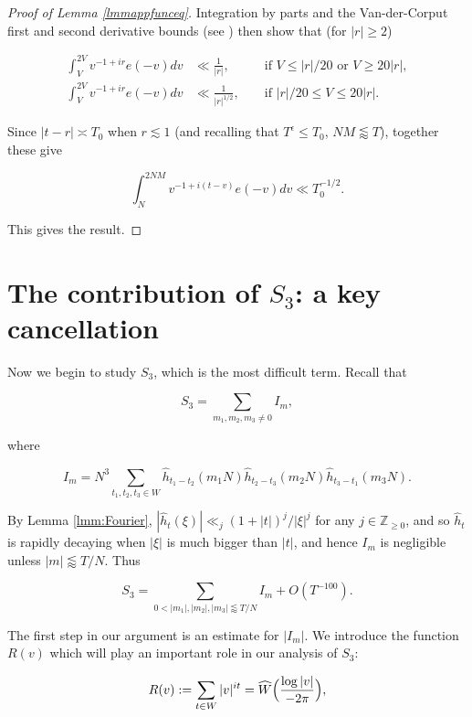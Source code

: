 \documentclass{amsart}
\theoremstyle{plain}
\numberwithin{equation}{section}
\begin{document}
\begin{proof}[Proof of Lemma \ref{lmmappfunceq}]
Integration by parts and the Van-der-Corput first and second derivative bounds (see \cite[Chapter 3, Lemmas 1 and 2]{M2}) then show that (for $|r|\ge 2$)

\begin{align*}
\int_V^{2V} v^{-1+ir}e(-v)dv&\ll \frac{1}{|r|}, &&\text{ if }V\le |r|/20 \text{ or }V\ge 20|r|,\\
\int_V^{2V} v^{-1+ir}e(-v)dv&\ll \frac{1}{|r|^{1/2}}, &&\text{ if }|r|/20\le V\le 20|r|.
\end{align*}

Since $|t-r|\asymp T_0$ when $r\lesssim 1$ (and recalling that $T^\epsilon\le T_0$, $NM\lessapprox T$), together these give

\[
\int_{N}^{2NM}v^{-1+i(t-v)}e(- v) dv\ll T_0^{-1/2}.
\]

This gives the result.
\end{proof}

%
%
%
%



\section{The contribution of \texorpdfstring{$S_3$}{S3}: a key cancellation}

Now we begin to study $S_3$, which is the most difficult term.  Recall that 

\[
S_3=\sum_{m_1,m_2,m_3 \not= 0} I_m, 
\]

where

\[
 I_m = N^3 \sum_{t_1,t_2,t_3\in W}\widehat{h}_{t_1-t_2}(m_1N)\widehat{h}_{t_2-t_3}(m_2N)\widehat{h}_{t_3-t_1}(m_3N). 
 \]
 
 By Lemma \ref{lmm:Fourier}, $|\widehat{h}_t(\xi)|\ll_j (1+|t|)^j/|\xi|^j$  for any $j\in\mathbb{Z}_{\ge 0}$,  and so $\widehat{h}_t$ is rapidly decaying when $|\xi|$ is much bigger than $|t|$, and hence $I_m$ is negligible unless $|m| \lessapprox T/N$.  Thus 

\begin{equation}
S_3= \sum_{0<|m_1|,|m_2|,|m_3| \lessapprox T/N} I_m+O(T^{-100}).
\label{eq:S3Inter}
\end{equation}

The first step in our argument is an estimate for $|I_m|$.   We introduce the function $R(v)$ which will play an important role in our analysis of $S_3$:

\begin{equation}
R(v):=\sum_{t\in W}|v|^{it} = \widehat{W}\Bigl(\frac{\log{|v|}}{-2\pi}\Bigr), \label{eq:RDef}
\end{equation}
\end{document}
